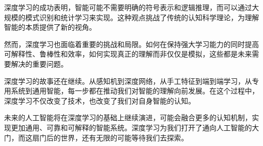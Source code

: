 深度学习的成功表明，智能可能不需要明确的符号表示和逻辑推理，而可以通过大规模的模式识别和统计学习来实现。这种观点挑战了传统的认知科学理论，为理解智能的本质提供了新的视角。

然而，深度学习也面临着重要的挑战和局限。如何在保持强大学习能力的同时提高可解释性、鲁棒性和效率，如何实现真正的理解而非仅仅是模拟，这些都是未来需要解决的重要问题。

深度学习的故事还在继续。从感知机到深度网络，从手工特征到端到端学习，从专用系统到通用智能，每一步都在推动我们对智能的理解向前发展。在这个过程中，深度学习不仅改变了技术，也改变了我们对自身智能的认知。

未来的人工智能将在深度学习的基础上继续演进，可能会融合更多的认知机制，实现更加通用、可靠和可解释的智能系统。深度学习为我们打开了通向人工智能的大门，而这扇门后的世界，还有无限的可能等待我们去探索。